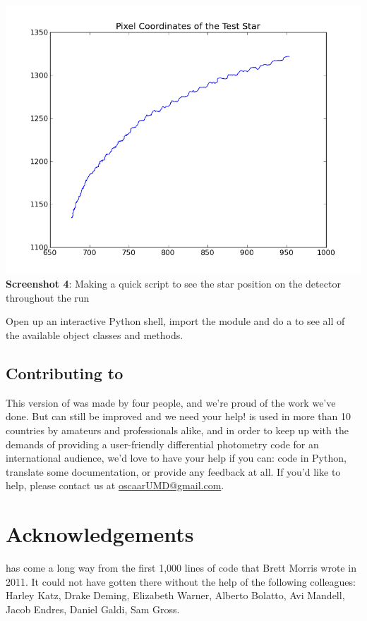 \documentclass{article}
\begin{document}
\begin{center}
\includegraphics[scale=0.5]{imgs/sample.png} \\
{\small \textbf{Screenshot 4}: Making a quick script to see the star position on the detector throughout the run}
\end{center}
\bigskip

\noindent Open up an interactive Python shell, import the module and do a  to see all of the available object classes and methods. 



\subsection{Contributing to \oscaar}
This version of \oscaar was made by four people, and we're proud of the work we've done. But \oscaar can still be improved and we need your help! \oscaar is used in more than 10 countries by amateurs and professionals alike, and in order to keep up with the demands of providing a user-friendly differential photometry code for an international audience, we'd love to have your help if you can: code in Python, translate some documentation, or provide any feedback at all. If you'd like to help, please contact us at \href{mailto:oscaarUMD@gmail.com}{oscaarUMD@gmail.com}. 




\section{Acknowledgements}
\oscaar has come a long way from the first 1,000 lines of code that Brett Morris wrote in 2011. It could not have gotten there without the help of the following colleagues: 
Harley Katz, Drake Deming, Elizabeth Warner, Alberto Bolatto, Avi Mandell, Jacob Endres, Daniel Galdi, Sam Gross.

	
\end{document}
